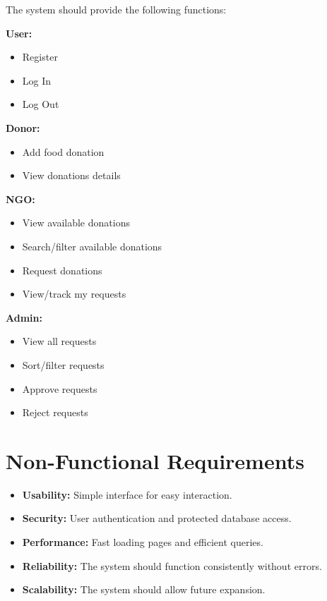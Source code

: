The system should provide the following functions:

\textbf{User:}
\begin{itemize}
    \item Register
    \item Log In
    \item Log Out
\end{itemize}

 \vspace{15pt}
\textbf{Donor:}
\begin{itemize}
    \item Add food donation
    \item View donations details
\end{itemize}

\textbf{NGO:}
\begin{itemize}
    \item View available donations
    \item Search/filter available donations
    \item Request donations
    \item View/track my requests
\end{itemize}

 \vspace{10pt}
\textbf{Admin:}
\begin{itemize}
    \item View all requests
    \item Sort/filter requests
    \item Approve requests
    \item Reject requests
\end{itemize}






 \vspace{50pt}
\section{Non-Functional Requirements}

\begin{itemize}
    \item \textbf{Usability:} Simple interface for easy interaction.
    \item \textbf{Security:} User authentication and protected database access.
    \item \textbf{Performance:} Fast loading pages and efficient queries.
    \item \textbf{Reliability:} The system should function consistently without errors.
    \item \textbf{Scalability:} The system should allow future expansion.
\end{itemize}





